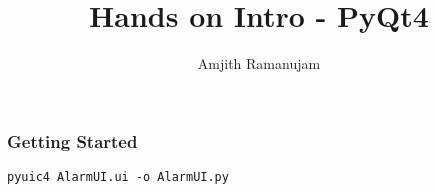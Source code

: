 \documentclass{beamer}
\title{Hands on Intro - PyQt4}
\author{Amjith Ramanujam}
\institute{twitter: amjith\_\\
blog: amjith.blogspot.com}
\begin{document}
\begin{frame}
    \frametitle{Getting Started}
    \begin{block}{}
    \end{block}
\end{frame}
\begin{block}{}
\begin{lstlisting}
pyuic4 AlarmUI.ui -o AlarmUI.py
\end{lstlisting}
\end{block}
\end{document}

